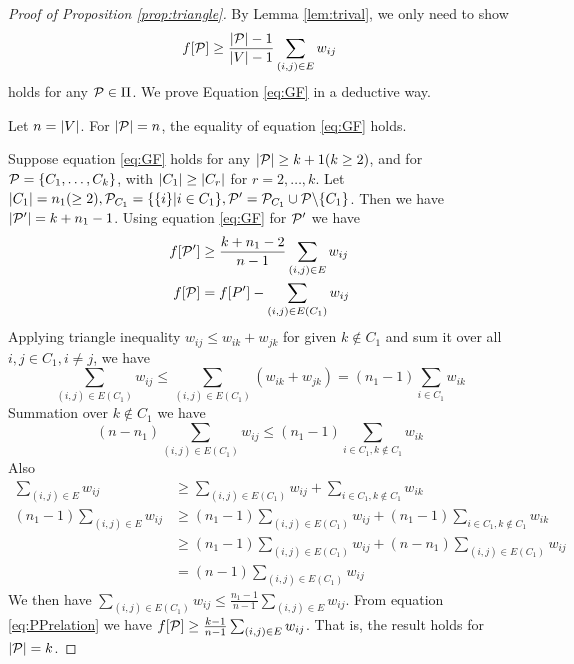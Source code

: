 \begin{proof}[Proof of Proposition \ref{prop:triangle}]
By Lemma \ref{lem:trival}, we only need to show
\begin{equation}\label{eq:GF}
f[\P] \geq \frac{\abs{\P}-1}{\abs{V}-1} \sum_{(i,j) \in E} w_{ij}
\end{equation}
holds for any $\P \in \Pi$. We prove Equation \ref{eq:GF} in a deductive way.

Let $n=\abs{V}$. For $\abs{\P}=n$, the equality of equation \ref{eq:GF} holds. 

Suppose equation \eqref{eq:GF} holds for any $\abs{\P} \geq k+1(k\geq 2)$, and for $\P=\{C_1, \dots, C_k\}$, with $\abs{C_1} \geq \abs{C_r}$ for $r=2,\dots, k$. Let $\abs{C_1}=n_1(\geq 2), \P_{C_1} = \{\{i\}| i \in C_1\}, \P'=\P_{C_1} \cup \P \backslash \{C_1\}$. Then we have $\abs{\P'} = k+n_1-1$. Using equation \eqref{eq:GF} for $\P'$ we have
\begin{align}\label{eq:PPrelation}
f[\P'] & \geq \frac{k+n_1 -2}{n-1}\sum_{(i,j) \in E} w_{ij} \\
f[\P] & =f[P'] - \sum_{(i,j) \in E(C_1)} w_{ij}
\end{align}
Applying triangle inequality $w_{ij} \leq w_{ik} + w_{jk}$ for given $k\not\in C_1$ and sum it over all $i, j \in C_1, i\neq j$, we have
$$
\sum_{(i,j) \in E(C_1)} w_{ij} \leq \sum_{(i,j) \in E(C_1)} (w_{ik} + w_{jk}) = (n_1-1)\sum_{i\in C_1} w_{ik}
$$
Summation over $k \not\in C_1$ we have 
$$
(n - n_1) \sum_{(i,j) \in E(C_1)} w_{ij} \leq (n_1 - 1) \sum_{i \in C_1, k \not\in C_1} w_{ik}
$$
Also
\begin{align*}
\sum_{(i,j) \in E} w_{ij}  & \geq \sum_{(i,j) \in E(C_1)} w_{ij} + \sum_{i\in C_1, k\not\in C_1} w_{ik} \\
(n_1 - 1)\sum_{(i,j) \in E} w_{ij}  & \geq (n_1 -1 )\sum_{(i,j) \in E(C_1)} w_{ij} + (n_1-1)\sum_{i\in C_1, k\not\in C_1} w_{ik} \\
& \geq (n_1 -1 )\sum_{(i,j) \in E(C_1)} w_{ij} + (n - n_1) \sum_{(i,j) \in E(C_1)} w_{ij}\\
& = (n-1) \sum_{(i,j) \in E(C_1)} w_{ij}
\end{align*}
We then have $\sum_{(i,j) \in E(C_1)} w_{ij} \leq \frac{n_1-1}{n-1}\sum_{(i,j) \in E} w_{ij}$. From equation \eqref{eq:PPrelation} we have 
$f[\P] \geq \frac{k-1}{n-1}\sum_{(i,j) \in E} w_{ij}$. That is, the result holds for $\abs{\P}=k$.
\end{proof}

